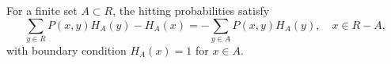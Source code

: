 For a finite set \(A \subset R\), the hitting probabilities satisfy
\[
\sum_{y \in R} P(x,y) H_A(y) - H_A(x) = -\sum_{y \in A} P(x,y) H_A(y), \quad x \in R - A,
\]
with boundary condition \(H_A(x) = 1\) for \(x \in A\).
